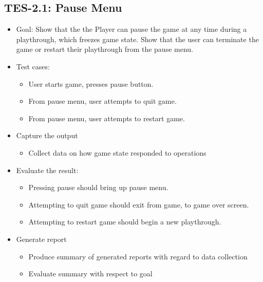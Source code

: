 \subsection{TES-2.1: Pause Menu }
\begin{itemize}
\item Goal: Show that the the Player can pause the game at any time during
a playthrough, which freezes game state. Show that the user can terminate
the game or restart their playthrough from the pause menu.
\item Test cases: 

\begin{itemize}
\item User starts game, presses pause button. 
\item From pause menu, user attempts to quit game. 
\item From pause menu, user attempts to restart game.
\end{itemize}
\item Capture the output 

\begin{itemize}
\item Collect data on how game state responded to operations 
\end{itemize}
\item Evaluate the result: 

\begin{itemize}
\item Pressing pause should bring up pause menu. 
\item Attempting to quit game should exit from game, to game over screen. 
\item Attempting to restart game should begin a new playthrough. 
\end{itemize}
\item Generate report 

\begin{itemize}
\item Produce summary of generated reports with regard to data collection 
\item Evaluate summary with respect to goal
\end{itemize}
\end{itemize}

